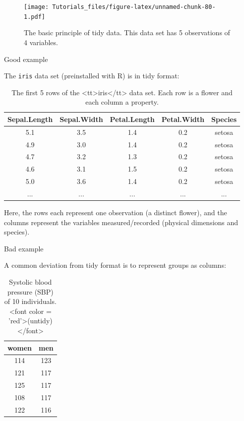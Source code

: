 \documentclass[
]{book}
\begin{document}
\begin{figure}
\centering
\texttt{[image: Tutorials\_files/figure-latex/unnamed-chunk-80-1.pdf]}
\caption{\label{fig:unnamed-chunk-80}The basic principle of tidy data. This data set has 5 observations of 4 variables.}
\end{figure}

Good example

The \texttt{iris} data set (preinstalled with R) is in tidy format:

\begin{table}

\caption{\label{tab:unnamed-chunk-81}The first 5 rows of the <tt>iris</tt> data set. Each row is a flower and each column a property.}
\centering
\fontsize{11}{13}\selectfont
\begin{tabular}[t]{c|c|c|c|c}
\hline
Sepal.Length & Sepal.Width & Petal.Length & Petal.Width & Species\\
\hline
5.1 & 3.5 & 1.4 & 0.2 & setosa\\
\hline
4.9 & 3.0 & 1.4 & 0.2 & setosa\\
\hline
4.7 & 3.2 & 1.3 & 0.2 & setosa\\
\hline
4.6 & 3.1 & 1.5 & 0.2 & setosa\\
\hline
5.0 & 3.6 & 1.4 & 0.2 & setosa\\
\hline
... & ... & ... & ... & ...\\
\hline
\end{tabular}
\end{table}

Here, the rows each represent one observation (a distinct flower), and the columns represent the variables measured/recorded (physical dimensions and species).

Bad example

A common deviation from tidy format is to represent groups as columns:

\begin{table}

\caption{\label{tab:unnamed-chunk-82}Systolic blood pressure (SBP) of 10 individuals. <font color = 'red'>(untidy)</font>}
\centering
\fontsize{11}{13}\selectfont
\begin{tabular}[t]{c|c}
\hline
women & men\\
\hline
114 & 123\\
\hline
121 & 117\\
\hline
125 & 117\\
\hline
108 & 117\\
\hline
122 & 116\\
\hline
\end{tabular}
\end{table}
\end{document}
